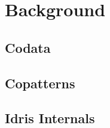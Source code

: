 \section{Background}
\label{sec:background}

\subsection{Codata}

\subsection{Copatterns}

\subsection{Idris Internals}